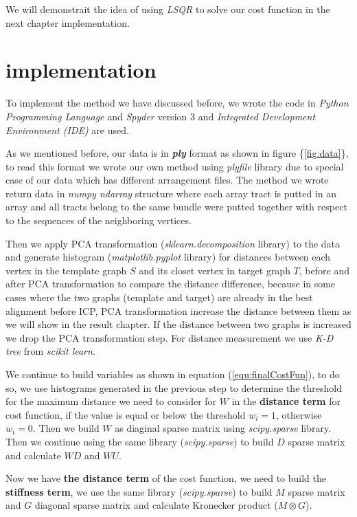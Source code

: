 \documentclass[../structure.tex]{subfiles}
\begin{document}
We will demonstrait the idea of using \textit{LSQR} to solve our cost function in the next chapter implementation.


\section{implementation}
To implement the method we have discussed before, we wrote the code in \textit{Python Programming Language} and \textit{Spyder} version 3 and \textit{Integrated Development Environment (IDE)} are used.

As we mentioned before, our data is in \textit{\textbf{ply}} format as shown in figure \{\ref{fig:data}\}, to read this format we wrote our own method using \textit{plyfile} library due to special case of our data which has different arrangement files. The method we wrote return data in \textit{numpy ndarray} structure where each array tract is putted in an array and all tracts belong to the same bundle were putted together with respect to the sequences of the neighboring vertices.

Then we apply PCA transformation (\textit{sklearn.decomposition} library) to the data and generate histogram (\textit{matplotlib.pyplot} library) for distances between each vertex in the template graph $S$ and its closet vertex in target graph $T$, before and after PCA transformation to compare the distance difference, because in some cases where the two graphs (template and target) are already in the best alignment before ICP, PCA transformation increase the distance between them as we will show in the result chapter. If the distance between two graphs is increased we drop the PCA transformation step. For distance measurement we use \textit{K-D tree} from \textit{scikit learn}.

We continue to build variables as shown in equation (\ref{equ:finalCostFun}), to do so, we use histograms generated in the previous step to determine the threshold for the maximum distance we need to consider for $W$ in the \textbf{distance term} for cost function, if the value is equal or below the threshold $w_{i} = 1$, otherwise $w_{i} = 0$. Then we build $W$ as diaginal sparse matrix using \textit{scipy.sparse} library. Then we continue using the same library (\textit{scipy.sparse}) to build $D$ sparse matrix and calculate $WD$ and $WU$.

Now we have \textbf{the distance term} of the cost function, we need to build the \textbf{stiffness term}, we use the same library (\textit{scipy.sparse}) to build $M$ sparse matrix and $G$ diagonal sparse matrix and calculate Kronecker product ($M\otimes G$).
\end{document}
